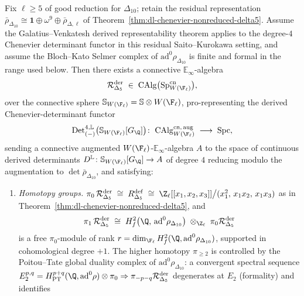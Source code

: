 \begin{theorem}
\label{thm:dl-derived-chenevier-gv-delta5}
\ClaimStatusConditional
Fix $\ell\ge 5$ of good reduction for $\Delta_{10}$; retain the
residual representation
$\bar\rho_{\Delta_{10}}\cong\mathbf 1\oplus\omega^9\oplus\bar\rho_{\Delta,\ell}$
of Theorem~\ref{thm:dl-chenevier-nonreduced-delta5}. Assume the
Galatius--Venkatesh derived representability theorem applies to the
degree-$4$ Chenevier determinant functor in this residual
Saito--Kurokawa setting, and assume the Bloch--Kato Selmer complex of
$\mathrm{ad}^0\rho_{\Delta_{10}}$ is finite and formal in the range
used below. Then there exists a
connective $\mathbb E_\infty$-algebra
\[
 \mathcal R^{\mathrm{der}}_{\Delta_5}
 \;\in\;\mathrm{CAlg}\bigl(\mathrm{Sp}_{W(\F_\ell)}^{\mathrm{cn}}\bigr),
\]
over the connective sphere $\mathbb S_{W(\F_\ell)}=\mathbb S\otimes W(\F_\ell)$,
pro-representing the derived Chenevier-determinant functor
\[
 \mathrm{Det}^{4,\mathbb L}_{(-)}\bigl(\mathbb S_{W(\F_\ell)}[G_\Q]\bigr)
 \colon\;\mathrm{CAlg}^{\mathrm{cn,\,aug}}_{W(\F_\ell)}
 \;\longrightarrow\;\mathrm{Spc},
\]
sending a connective augmented $W(\F_\ell)$-$\mathbb E_\infty$-algebra $A$
to the space of continuous derived determinants
$D^{\mathbb L}\colon\mathbb S_{W(\F_\ell)}[G_\Q]\to A$ of degree $4$
reducing modulo the augmentation to $\det\bar\rho_{\Delta_{10}}$, and
satisfying:
\begin{enumerate}
 \item \emph{Homotopy groups.}
 \(
 \pi_0\,\mathcal R^{\mathrm{der}}_{\Delta_5}
 \;\cong\; R^{\mathrm{def}}_{\Delta_5}
 \;\cong\;
 \Z_\ell[[x_1,x_2,x_3]]\big/(x_1^2,\,x_1 x_2,\,x_1 x_3)
 \)
 as in Theorem~\ref{thm:dl-chenevier-nonreduced-delta5}, and
 \[
 \pi_1\,\mathcal R^{\mathrm{der}}_{\Delta_5}
 \;\cong\; H^2_f\bigl(\Q,\,\mathrm{ad}^0\rho_{\Delta_{10}}\bigr)
 \;\otimes_{\Z_\ell}\;\pi_0\mathcal R^{\mathrm{der}}_{\Delta_5}
 \]
 is a free $\pi_0$-module of rank
 $r = \dim_{\F_\ell} H^2_f(\Q,\mathrm{ad}^0\rho_{\Delta_{10}})$,
 supported in cohomological degree $+1$. The higher homotopy
 $\pi_{\ge 2}$ is controlled by the Poitou--Tate global
 duality complex of $\mathrm{ad}^0\rho_{\Delta_{10}}$: a
 convergent spectral sequence
 $E_2^{p,q} = H^{p+q}_{\mathrm{PT}}(\Q,\mathrm{ad}^0\rho)
 \otimes\pi_0 \Rightarrow\pi_{-p-q}\mathcal R^{\mathrm{der}}_{\Delta_5}$
 degenerates at $E_2$ (formality) and identifies

\end{enumerate}
\end{theorem}
